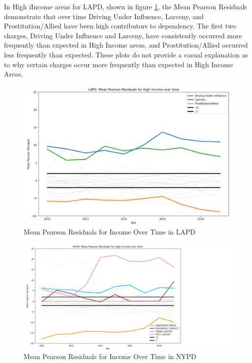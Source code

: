 \documentclass{article}
\begin{document}
In High iIncome areas for LAPD, shown in figure \ref{lapd_over_time}, the Mean Pearson Residuals demonstrate that over time Driving Under Influence, Larceny, and Prostitution/Allied have been high contributors to dependency. The first two charges, Driving Under Influence and Larceny, have consistently occurred more frequently than expected in High Income areas, and Prostitution/Allied occurred less frequently than expected. These plots do not provide a casual explanation as to why certain charges occur more frequently than expected in High Income Areas.

\newpage
{}
\begin{figure}[!ht]
    \centering
    \includegraphics[scale = .7]{Graphics/LAPD_mean_pearson_residuals_over_time.jpg}
    \caption{Mean Pearson Residuals for Income Over Time in LAPD }
  \label{lapd_over_time}
\end{figure}




\begin{figure}[!ht]
    \centering
    \includegraphics[scale = .7]{Graphics/NYPD_mean_pearson_residuals_over_time.jpg}
    \caption{Mean Pearson Residuals for Income Over Time in NYPD }
  \label{nypd_over_time}
\end{figure}
\end{document}
